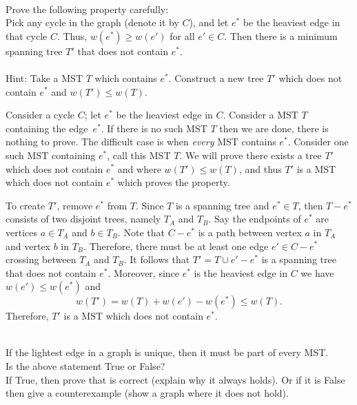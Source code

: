 \documentclass[12pt]{amsart}
\theoremstyle{plain}
\theoremstyle{definition}
\theoremstyle{remark}
\begin{document}
\newpage

	  \\
	Prove the following property carefully:\\
	Pick any cycle in the graph (denote it by $C$), and let $e^*$ be the heaviest edge in that cycle $C$.  Thus, $w(e^*)\geq w(e')$ for all $e'\in C$. 
	Then there is a minimum spanning tree $T'$ that does not contain $e^*$.\\\\
	Hint: Take a MST $T$ which contains $e^*$.  Construct a new tree $T'$ which does not
	contain $e^*$ and $w(T')\leq w(T)$.   
	
\begin{tcolorbox}
	Consider a cycle $C$; let $e^*$ be the heaviest edge in $C$. 
	Consider a MST $T$ containing the edge~$e^*$.  If there is no such MST $T$ then we
	are done, there is nothing to prove.  The difficult case is when {\em every} MST contains
	$e^*$.  Consider one such MST containing $e^*$, call this MST $T$.  
	We will prove there exists a tree $T'$ which does not contain $e^*$ and where 
	$w(T')\leq w(T)$, and thus $T'$ is a MST which does not contain $e^*$ which proves the
	property.
	
	To create $T'$, remove $e^*$ from $T$.  Since $T$ is a spanning tree and $e^* \in T$, 
	then $T -  e^* $ consists of two disjoint trees, namely $T_A$ and $T_B$. 
	Say the endpoints of $e^*$ are vertices $a\in T_A$ and $b\in T_B$.  
	Note that $C - e^*$ is a path between vertex $a$ in $T_A$ and vertex $b$ in $T_B$. 
	Therefore, there must be at least one edge $e' \in C -  e^*$ crossing between $T_A$ and $T_B$. 
	 It follows that $T' = T\cup e' - e^*$ is a spanning tree that does not contain $e^*$. 
	Moreover, since $e^*$ is the heaviest edge in $C$ we have $w(e')\leq w(e^*)$ and
	\[  w(T') = w(T) + w(e') - w(e^*) \leq w(T). 
	\]
	Therefore, $T'$ is a MST which does not contain $e^*$.
\end{tcolorbox}

 \newpage
 	  \\ 
If the lightest edge in a graph is unique, then it must be part of every MST.\\
Is the above statement True or False?   
\\
If True, then prove that is correct (explain why it always holds).  Or if it is
False then give a counterexample (show a graph where it does not hold).  
\end{document}
